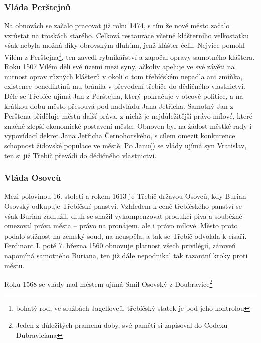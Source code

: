 \documentclass[a4paper,oneside,12p]{report}
\let\openright=\clearpage
\begin{document}
\subsubsection{Vláda Perštejnů}

Na obnovách se začalo pracovat již roku 1474, s tím že nové město začalo vzrůstat na troskách starého.
Celková restaurace včetně klášterního velkostatku však nebyla možná díky obrovským dluhům, jenž klášter čelil.
Nejvíce pomohl Vilém z Perštejna\footnote{bohatý rod, ve službách Jagellovců, třebíčský statek je pod jeho kontrolou}, ten zavedl rybnikářství a započal opravy samotného kláštera.
Roku 1507 Vilém dělí své území mezi syny, ačkoliv apeluje ve své závěti na nutnost oprav různých klášterů v okoli o tom třebíčském nepadla ani zmíňka, existence benediktínů mu bránila v převedení třebíče do dědičného vlastnictví.
Déle se Třebíče ujímá Jan z Perštejna, který pokračuje v otcově politice, a na krátkou dobu město přesouvá pod nadvládu Jana Jetřicha.
Samotný Jan z Perštena přiděluje městu další práva, z nichž je nejdůležitější právo mílové, které značně zlepší ekonomické postavení města.
Obnoven byl na žádost městké rady i vypovídací dekret Jana Jetřicha Černohorského, s cílem omezit konkurence schopnost židovské populace ve městě.
Po Janu() se vlády ujímá syn Vratislav, ten si již Třebíč převádí do dědičného vlastnictví. %

\subsubsection{Vláda Osovců}
Mezi polovinou 16. století a rokem 1613 je Třebíč državou Osovců, kdy Burian Osovský odkupuje Třebíčské panství.
Vzhledem k ceně třebíčského panství se však Burian zadlužil, dluh se snažil vykompenzovat produkcí piva a souběžně omezoval práva města -- právo na pronájem, ale i právo mílové.
Město proto podalo stížnost na zemský soud, na neuspěla, a tak se Třebíč odvolala k císaři.
Ferdinant I. poté 7. března 1560 obnovuje platnost všech privilégií, zároveň napomíná samotného Buriana, ten již dále nepodnikal tak razantní kroky proti městu.

Roku 1568 se vlády nad městem ujímá Smil Osovský z Doubravice\footnote{Jeden z důležitých pramenů doby, své paměti si zapisoval do Codexu Dubraviciana}





\listoffigures
\openright
\end{document}
